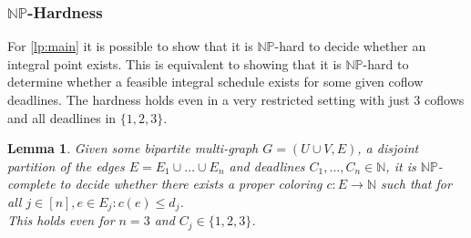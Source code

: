 \documentclass[11pt]{article}
\newtheorem{lemma}[theorem]{Lemma}
\begin{document}
\subsubsection*{$\mathbb{NP}$-Hardness}

For \ref{lp:main} it is possible to show that it is $\mathbb{NP}$-hard to decide whether an integral point exists. This is equivalent to showing that it is $\mathbb{NP}$-hard to determine whether a feasible integral schedule exists for some given coflow deadlines. The hardness holds even in a very restricted setting with just $3$ coflows and all deadlines in $\{1,2,3\}$.

\begin{lemma}\label{lemma:coflownphardness}
Given some bipartite multi-graph $G = (U \cup V, E)$, a disjoint partition of the edges $E = E_1 \cup \dotsc \cup E_n$ and deadlines $C_1,\dotsc,C_n \in \mathbb{N}$, it is $\mathbb{NP}$-complete to decide whether there exists a proper coloring $c: E \rightarrow \mathbb{N}$ such that for all $j \in [n], e \in E_j: c(e) \le d_j$.\\
This holds even for $n=3$ and $C_j \in \{1,2,3\}$.
\end{lemma}
\end{document}
